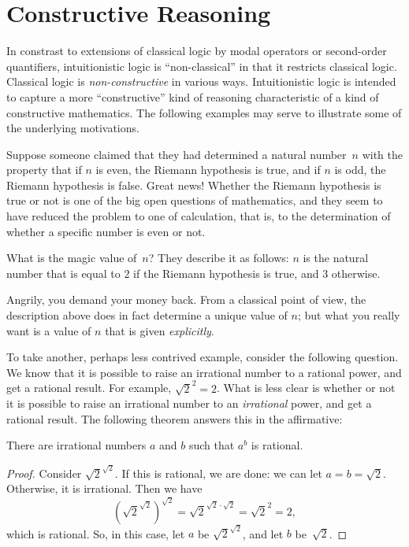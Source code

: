 \documentclass[../../../include/open-logic-chapter]{subfiles}
\begin{document}

\section{Constructive Reasoning}

In constrast to extensions of classical logic by modal operators or
second-order quantifiers, intuitionistic logic is ``non-classical'' in
that it restricts classical logic.  Classical logic is
\emph{non-constructive} in various ways. Intuitionistic logic is
intended to capture a more ``constructive'' kind of reasoning
characteristic of a kind of constructive mathematics. The following
examples may serve to illustrate some of the underlying motivations.

Suppose someone claimed that they had determined a natural number~$n$
with the property that if $n$ is even, the Riemann hypothesis is
true, and if $n$ is odd, the Riemann hypothesis is false. Great
news!{} Whether the Riemann hypothesis is true or not is one of the
big open questions of mathematics, and they seem to have reduced the
problem to one of calculation, that is, to the determination of
whether a specific number is even or not.

What is the magic value of~$n$? They describe it as follows: $n$ is
the natural number that is equal to $2$ if the Riemann hypothesis is
true, and $3$ otherwise.

Angrily, you demand your money back. From a classical point of view,
the description above does in fact determine a unique value of $n$;
but what you really want is a value of $n$ that is given
\emph{explicitly}.

To take another, perhaps less contrived example, consider the
following question. We know that it is possible to raise an irrational
number to a rational power, and get a rational result. For example,
$\sqrt{2}^2 = 2$. What is less clear is whether or not it is possible
to raise an irrational number to an \emph{irrational} power, and get a
rational result. The following theorem answers this in the
affirmative:

\begin{thm}
There are irrational numbers $a$ and $b$ such that $a^b$ is rational.
\end{thm}

\begin{proof}
Consider $\sqrt{2}^{\sqrt{2}}$. If this is rational, we are done:
we can let $a = b = \sqrt{2}$. Otherwise, it is irrational. Then we
have
\[
(\sqrt{2}^{\sqrt{2}})^{\sqrt{2}} = \sqrt{2}^{\sqrt{2} \cdot
  \sqrt{2}} = \sqrt{2}^2 = 2,
\]
which is rational. So, in this case, let $a$ be
$\sqrt{2}^{\sqrt{2}}$, and let $b$ be~$\sqrt 2$.
\end{proof}
\end{document}
